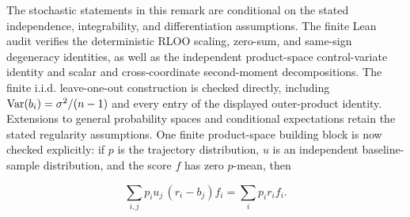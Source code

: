 The stochastic statements in this remark are conditional on the stated
independence, integrability, and differentiation assumptions. The finite
Lean audit verifies the deterministic RLOO scaling, zero-sum, and same-sign
degeneracy identities, as well as the independent product-space control-variate
identity and scalar and cross-coordinate second-moment decompositions. The
finite i.i.d. leave-one-out construction is checked directly, including
$\mathrm{Var}(b_i)=\sigma^2/(n-1)$ and every entry of the displayed outer-product
identity. Extensions to general probability spaces and conditional expectations
retain the stated regularity assumptions.
One finite product-space building block is now checked explicitly: if $p$ is
the trajectory distribution, $u$ is an independent baseline-sample
distribution, and the score $f$ has zero $p$-mean, then

\begin{equation*}
    \sum_{i,j}p_i u_j\,(r_i-b_j)f_i
    = \sum_i p_i r_i f_i.
\end{equation*}

